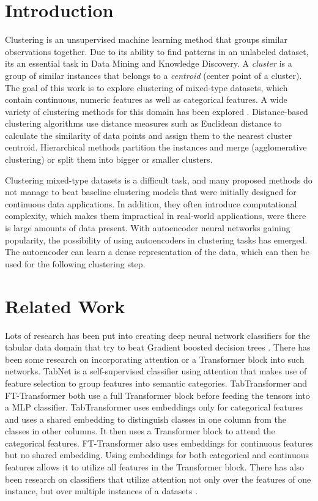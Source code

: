 \chapter{Introduction}

Clustering is an unsupervised machine learning method that groups similar observations together. Due to its ability to find patterns in an unlabeled dataset, its an essential task in Data Mining and Knowledge Discovery. A \textit{cluster} is a group of similar instances that belongs to a \textit{centroid} (center point of a cluster). The goal of this work is to explore clustering of mixed-type datasets, which contain continuous, numeric features as well as categorical features. A wide variety of clustering methods for this domain has been explored \cite{mixed_type_survey_2019}. Distance-based clustering algorithms use distance measures such as Euclidean distance to calculate the similarity of data points and assign them to the nearest cluster centroid. Hierarchical methods partition the instances and merge (agglomerative clustering) or split them into bigger or smaller clusters. 

Clustering mixed-type datasets is a difficult task, and many proposed methods do not manage to beat baseline clustering models that were initially designed for continuous data applications. In addition, they often introduce computational complexity, which makes them impractical in real-world applications, were there is large amounts of data present. With autoencoder neural networks gaining popularity, the possibility of using autoencoders in clustering tasks has emerged. The autoencoder can learn a dense representation of the data, which can then be used for the following clustering step.

\chapter{Related Work}

Lots of research has been put into creating deep neural network classifiers for the tabular data domain that try to beat Gradient boosted decision trees \cite{deep_neural_networks_tabular_data_survey}. There has been some research on incorporating attention or a Transformer block into such networks. TabNet \cite{tabnet} is a self-supervised classifier using attention that makes use of feature selection to group features into semantic categories. TabTransformer \cite{tab_transformer} and FT-Transformer \cite{ft_transformer} both use a full Transformer block before feeding the tensors into a MLP classifier. TabTransformer uses embeddings only for categorical features and uses a shared embedding to distinguish classes in one column from the classes in other columns. It then uses a Transformer block to attend the categorical features. FT-Transformer also uses embeddings for continuous features but no shared embedding. Using embeddings for both categorical and continuous features allows it to utilize all features in the Transformer block. There has also been research on classifiers that utilize attention not only over the features of one instance, but over multiple instances of a datasets \cite{attention_between_datapoints, saint}.


